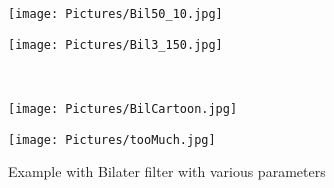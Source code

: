 \documentclass[11pt,a4paper]{article}
\begin{document}
  \begin{figure}[htbp]
    \centering
    \begin{minipage}{0.5\textwidth}
      \centering
    \texttt{[image: Pictures/Bil50\_10.jpg]}
    \end{minipage}%
\begin{minipage}{0.5\textwidth}
  \centering
\texttt{[image: Pictures/Bil3\_150.jpg]}
\end{minipage}\\
    \begin{minipage}{0.5\textwidth}
      \centering
    \texttt{[image: Pictures/BilCartoon.jpg]}
    \label{fig:cartoon}
      \end{minipage}%
      \begin{minipage}{0.5\textwidth}
        \centering
      \texttt{[image: Pictures/tooMuch.jpg]}
      \label{fig:tooMuch}
        \end{minipage}
    \caption{Example with Bilater filter with various parameters}
    \end{figure}     
\end{document}
